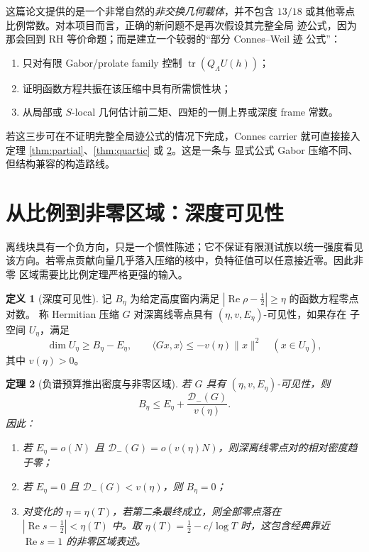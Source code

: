 \documentclass[UTF8,11pt,a4paper]{ctexart}
\newtheorem{theorem}{定理}[section]
\theoremstyle{definition}
\newtheorem{definition}[theorem]{定义}
\theoremstyle{remark}
\newcommand{\tr}{\operatorname{tr}}
\newcommand{\Rea}{\operatorname{Re}}
\begin{document}
这篇论文提供的是一个非常自然的\emph{非交换几何载体}，并不包含
$13/18$ 或其他零点比例常数。对本项目而言，正确的新问题不是再次假设其完整全局
迹公式，因为那会回到 RH 等价命题；而是建立一个较弱的“部分 Connes--Weil 迹
公式”：
\begin{enumerate}
\item 只对有限 Gabor/prolate family 控制 $\tr(Q_\Lambda U(h))$；
\item 证明函数方程共振在该压缩中具有所需惯性块；
\item 从局部或 $S$-local 几何估计前二矩、四矩的一侧上界或深度 frame 常数。
\end{enumerate}
若这三步可在不证明完整全局迹公式的情况下完成，Connes carrier 就可直接接入
定理 \ref{thm:partial}、\ref{thm:quartic} 或 \ref{thm:region}。这是一条与
显式公式 Gabor 压缩不同、但结构兼容的构造路线。

\section{从比例到非零区域：深度可见性}

离线块具有一个负方向，只是一个惯性陈述；它不保证有限测试族以统一强度看见
该方向。若零点贡献向量几乎落入压缩的核中，负特征值可以任意接近零。因此非零
区域需要比比例定理严格更强的输入。

\begin{definition}[深度可见性]\label{def:visibility}
记 $B_\eta$ 为给定高度窗内满足
$|\Rea\rho-\tfrac12|\ge\eta$ 的函数方程零点对数。
称 Hermitian 压缩 $G$ 对深离线零点具有 $(\eta,v,E_\eta)$-可见性，如果存在
子空间 $U_\eta$，满足
\[
 \dim U_\eta\ge B_\eta-E_\eta,\qquad
 \langle Gx,x\rangle\le-v(\eta)\|x\|^2
 \quad(x\in U_\eta),
\]
其中 $v(\eta)>0$。
\end{definition}

\begin{theorem}[负谱预算推出密度与非零区域]\label{thm:region}
若 $G$ 具有 $(\eta,v,E_\eta)$-可见性，则
\begin{equation}\label{eq:deepcount}
 B_\eta\le E_\eta+\frac{\mathcal{D}_-(G)}{v(\eta)}.
\end{equation}
因此：
\begin{enumerate}
\item 若 $E_\eta=o(N)$ 且
$\mathcal{D}_-(G)=o(v(\eta)N)$，则深离线零点对的相对密度趋于零；
\item 若 $E_\eta=0$ 且 $\mathcal{D}_-(G)<v(\eta)$，则 $B_\eta=0$；
\item 对变化的 $\eta=\eta(T)$，若第二条最终成立，则全部零点落在
$|\Rea s-\tfrac12|<\eta(T)$ 中。取
$\eta(T)=\tfrac12-c/\log T$ 时，这包含经典靠近 $\Rea s=1$
的非零区域表述。
\end{enumerate}
\end{theorem}
\end{document}
